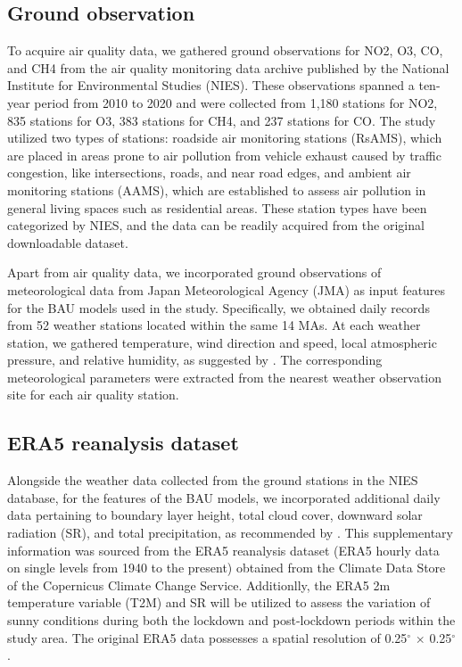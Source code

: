 \subsection{Ground observation}
To acquire air quality data, we gathered ground observations for NO2, O3, CO, and CH4 from the air quality monitoring data archive published by the National Institute for Environmental Studies (NIES). These observations spanned a ten-year period from 2010 to 2020 and were collected from 1,180 stations for NO2, 835 stations for O3, 383 stations for CH4, and 237 stations for CO. The study utilized two types of stations: roadside air monitoring stations (RsAMS), which are placed in areas prone to air pollution from vehicle exhaust caused by traffic congestion, like intersections, roads, and near road edges, and ambient air monitoring stations (AAMS), which are established to assess air pollution in general living spaces such as residential areas. These station types have been categorized by NIES, and the data can be readily acquired from the original downloadable dataset. \par
Apart from air quality data, we incorporated ground observations of meteorological data from Japan Meteorological Agency (JMA) as input features for the BAU models used in the study. Specifically, we obtained daily records from 52 weather stations located within the same 14 MAs. At each weather station, we gathered temperature, wind direction and speed, local atmospheric pressure, and relative humidity, as suggested by \citep{grange2021covid}. The corresponding meteorological parameters were extracted from the nearest weather observation site for each air quality station.\par

\subsection{ERA5 reanalysis dataset}
Alongside the weather data collected from the ground stations in the NIES database, for the features of the BAU models, we incorporated additional daily data pertaining to boundary layer height, total cloud cover, downward solar radiation (SR), and total precipitation, as recommended by \citep{shi2021abrupt}. This supplementary information was sourced from the ERA5 reanalysis dataset (ERA5 hourly data on single levels from 1940 to the present) obtained from the Climate Data Store of the Copernicus Climate Change Service. Additionlly, the ERA5 2m temperature variable (T2M) and SR will be utilized to assess the variation of sunny conditions during both the lockdown and post-lockdown periods within the study area. The original ERA5 data possesses a spatial resolution of 0.25$^{\circ}$ $\times$ 0.25$^{\circ}$ .\par

